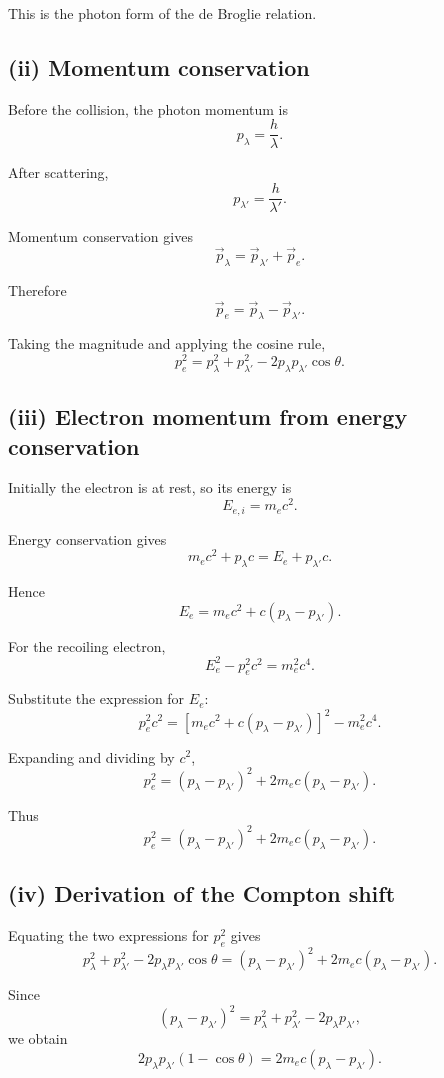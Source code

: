 \documentclass[11pt,a4paper]{article}
\begin{document}
This is the photon form of the de Broglie relation.

\subsection{(ii) Momentum conservation}

Before the collision, the photon momentum is
\[
p_\lambda=\frac h\lambda.
\]

After scattering,
\[
p_{\lambda'}=\frac h{\lambda'}.
\]

Momentum conservation gives
\[
\vec p_\lambda
=
\vec p_{\lambda'}+\vec p_e.
\]

Therefore
\[
\vec p_e
=
\vec p_\lambda-\vec p_{\lambda'}.
\]

Taking the magnitude and applying the cosine rule,
\[
\boxed{
p_e^2
=
p_\lambda^2+p_{\lambda'}^2
-2p_\lambda p_{\lambda'}\cos\theta
}.
\]

\subsection{(iii) Electron momentum from energy conservation}

Initially the electron is at rest, so its energy is
\[
E_{e,i}=m_ec^2.
\]

Energy conservation gives
\[
m_ec^2+p_\lambda c
=
E_e+p_{\lambda'}c.
\]

Hence
\[
E_e
=
m_ec^2+c(p_\lambda-p_{\lambda'}).
\]

For the recoiling electron,
\[
E_e^2-p_e^2c^2=m_e^2c^4.
\]

Substitute the expression for $E_e$:
\[
p_e^2c^2
=
\left[m_ec^2+c(p_\lambda-p_{\lambda'})\right]^2
-m_e^2c^4.
\]

Expanding and dividing by $c^2$,
\[
p_e^2
=
(p_\lambda-p_{\lambda'})^2
+
2m_ec(p_\lambda-p_{\lambda'}).
\]

Thus
\[
\boxed{
p_e^2
=
(p_\lambda-p_{\lambda'})^2
+
2m_ec(p_\lambda-p_{\lambda'})
}.
\]

\subsection{(iv) Derivation of the Compton shift}

Equating the two expressions for $p_e^2$ gives
\[
p_\lambda^2+p_{\lambda'}^2
-2p_\lambda p_{\lambda'}\cos\theta
=
(p_\lambda-p_{\lambda'})^2
+
2m_ec(p_\lambda-p_{\lambda'}).
\]

Since
\[
(p_\lambda-p_{\lambda'})^2
=
p_\lambda^2+p_{\lambda'}^2
-2p_\lambda p_{\lambda'},
\]
we obtain
\[
2p_\lambda p_{\lambda'}(1-\cos\theta)
=
2m_ec(p_\lambda-p_{\lambda'}).
\]
\end{document}
